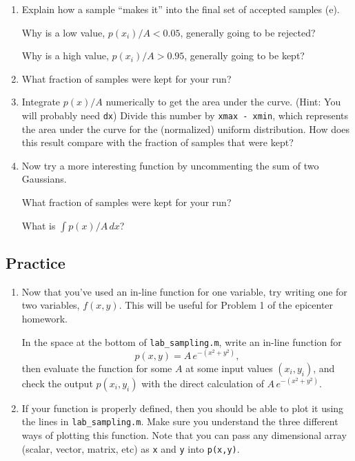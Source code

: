 \documentclass[11pt,titlepage,fleqn]{article}
\newcommand{\vertgap}{\vspace{1cm}}
\begin{document}
\begin{enumerate}
\vertgap

\item Explain how a sample ``makes it'' into the final set of accepted samples (e).

Why is a low value, $p(x_i)/A < 0.05$, generally going to be rejected?

Why is a high value, $p(x_i)/A > 0.95$, generally going to be kept?

\vertgap

\item What fraction of samples were kept for your run?

\vertgap

\item Integrate $p(x)/A$ numerically to get the area under the curve. (Hint: You will probably need \verb+dx+) Divide this number by \verb+xmax - xmin+, which represents the area under the curve for the (normalized) uniform distribution. How does this result compare with the fraction of samples that were kept?

\vertgap

\item Now try a more interesting function by uncommenting the sum of two Gaussians.

What fraction of samples were kept for your run?

What is $\int p(x)/A \, dx$?

\end{enumerate}


\subsection*{Practice}

\begin{enumerate}
\item Now that you've used an in-line function for one variable, try writing one for two variables, $f(x,y)$. This will be useful for Problem 1 of the epicenter homework.

In the space at the bottom of \verb+lab_sampling.m+, write an in-line function for 
%
\begin{equation*}
p(x,y) = A\,e^{-(x^2+y^2)},
\end{equation*}
%
then evaluate the function for some $A$ at some input values $(x_i,y_i)$, and check the output $p(x_i,y_i)$ with the direct calculation of $A\,e^{-(x^2+y^2)}$.

\item If your function is properly defined, then you should be able to plot it using the lines in \verb+lab_sampling.m+. Make sure you understand the three different ways of plotting this function. Note that you can pass any dimensional array (scalar, vector, matrix, etc) as \verb+x+ and \verb+y+ into \verb+p(x,y)+.

\end{enumerate}
\end{document}
